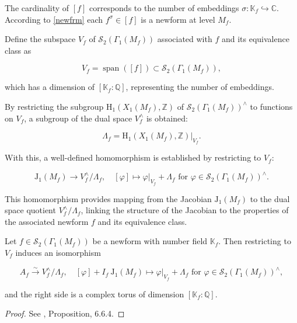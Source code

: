 The cardinality of \([f]\) corresponds to the number of embeddings \(\sigma: \mathbb{K}_{f} \hookrightarrow \mathbb{C}\). According to \ref{newfrm} each \(f^{\sigma} \in[f]\) is a newform at level \(M_{f}\).

Define the subspace \(V_{f}\) of \(\mathcal{S}_{2}\left(\Gamma_{1}\left(M_{f}\right)\right)\) associated with \(f\) and its equivalence class as

\[ V_{f}=\operatorname{span}([f]) \subset \mathcal{S}_{2}\left(\Gamma_{1}\left(M_{f}\right)\right), \]

which has a dimension of \(\left[\mathbb{K}_{f}: \mathbb{Q}\right]\), representing the number of embeddings.

By restricting the subgroup \(\mathrm{H}_{1}\left(X_{1}\left(M_{f}\right), \mathbb{Z}\right)\) of \(\mathcal{S}_{2}\left(\Gamma_{1}\left(M_{f}\right)\right)^{\wedge}\) to functions on \(V_{f}\), a subgroup of the dual space \(V_{f}^{\wedge}\) is obtained:

\[ \Lambda_{f}=\left.\mathrm{H}_{1}\left(X_{1}\left(M_{f}\right), \mathbb{Z}\right)\right|_{V_{f}} . \]

With this, a well-defined homomorphism is established by restricting to \(V_{f}\):

\[ \mathrm{J}_{1}\left(M_{f}\right) \longrightarrow V_{f}^{\wedge} / \Lambda_{f}, \quad [\varphi] \mapsto \varphi|_{V_{f}}+\Lambda_{f} \text { for } \varphi \in \mathcal{S}_{2}\left(\Gamma_{1}\left(M_{f}\right)\right)^{\wedge} . \]

This homomorphism provides mapping from the Jacobian \(\mathrm{J}_{1}\left(M_{f}\right)\) to the dual space quotient \(V_{f}^{\wedge} / \Lambda_{f}\), linking the structure of the Jacobian to the properties of the associated newform \(f\) and its equivalence class.

\begin{proposition}\label{reqdfrproof}
   Let $f \in \mathcal{S}_{2}\left(\Gamma_{1}\left(M_{f}\right)\right)$ be a newform with number field $\mathbb{K}_{f}$. Then restricting to $V_{f}$ induces an isomorphism

$$
A_{f} \stackrel{\sim}{\longrightarrow} V_{f}^{\wedge} / \Lambda_{f}, \quad[\varphi]+\left.I_{f} \mathrm{~J}_{1}\left(M_{f}\right) \mapsto \varphi\right|_{V_{f}}+\Lambda_{f} \text { for } \varphi \in \mathcal{S}_{2}\left(\Gamma_{1}\left(M_{f}\right)\right)^{\wedge},
$$

and the right side is a complex torus of dimension $\left[\mathbb{K}_{f}: \mathbb{Q}\right]$.
\begin{proof}

See \cite{diamond2005first}, Proposition, 6.6.4.
    
\end{proof} 
\end{proposition}

